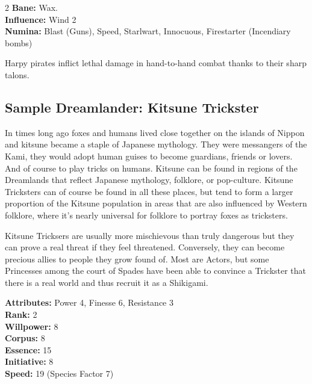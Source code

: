 \begin{multicols}{2}
\noindent \textbf{Bane:} Wax.\\

\noindent \textbf{Influence:} Wind 2\\

\noindent \textbf{Numina:} Blast (Guns), Speed, Starlwart, Innocuous, Firestarter (Incendiary bombs)

Harpy pirates inflict lethal damage in hand-to-hand combat thanks to their sharp talons.


\subsection*{Sample Dreamlander: Kitsune Trickster}
In times long ago foxes and humans lived close together on the islands of Nippon and kitsune became a staple of Japanese mythology. They were messangers of the Kami, they would adopt human guises to become guardians, friends or lovers. And of course to play tricks on humans. Kitsune can be found in regions of the Dreamlands that reflect Japanese mythology, folklore, or pop-culture. Kitsune Tricksters can of course be found in all these places, but tend to form a larger proportion of the Kitsune population in areas that are also influenced by Western folklore, where it's nearly universal for folklore to portray foxes as tricksters. 

Kitsune Tricksers are usually more mischievous than truly dangerous but they can prove a real threat if they feel threatened. Conversely, they can become precious allies to people they grow found of. Most are Actors, but some Princesses among the court of Spades have been able to convince a Trickster that there is a real world and thus recruit it as a Shikigami. 

\noindent \textbf{Attributes:} Power 4, Finesse 6, Resistance 3\\

\noindent \textbf{Rank:} 2\\

\noindent \textbf{Willpower:} 8\\

\noindent \textbf{Corpus:} 8\\

\noindent \textbf{Essence:} 15\\

\noindent \textbf{Initiative:} 8\\

\noindent \textbf{Speed:} 19 (Species Factor 7)\\


\end{multicols}
